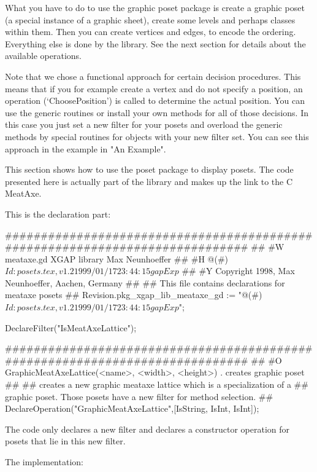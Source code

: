 What you have to do to use the graphic poset package is create a graphic
poset (a special instance of a graphic sheet), create some levels and
perhaps classes within them. Then you can create vertices and edges, to
encode the ordering. Everything else is done by the library. See the next
section for details about the available operations.

Note that we chose a functional approach for certain decision
procedures. This means that if you for example create a vertex and do not
specify a position, an operation (`ChoosePosition') is called to determine
the actual position. You can use the generic routines or install your own
methods for all of those decisions. In this case you just set a new filter
for your posets and overload the generic methods by special routines for
objects with your new filter set. You can see this approach in the example
in "An Example".




This section shows how to use the poset package to display posets. The code
presented here is actually part of the {\XGAP} library and makes up the
link to the C MeatAxe.

This is the declaration part:

\beginexample
#############################################################################
##
#W  meataxe.gd                  XGAP library                  Max Neunhoeffer
##
#H  @(#)$Id: posets.tex,v 1.2 1999/01/17 23:44:15 gap Exp $
##
#Y  Copyright 1998,       Max Neunhoeffer,              Aachen,       Germany
##
##  This file contains declarations for meataxe posets
##
Revision.pkg_xgap_lib_meataxe_gd :=
    "@(#)$Id: posets.tex,v 1.2 1999/01/17 23:44:15 gap Exp $";

DeclareFilter("IsMeatAxeLattice");

#############################################################################
##
#O  GraphicMeatAxeLattice(<name>, <width>, <height>)  . creates graphic poset
##
##  creates a new graphic meataxe lattice which is a specialization of a
##  graphic poset. Those posets have a new filter for method selection.
##
DeclareOperation("GraphicMeatAxeLattice",[IsString, IsInt, IsInt]);
\endexample

The code only declares a new filter and declares a constructor operation
for posets that lie in this new filter.

The implementation:

